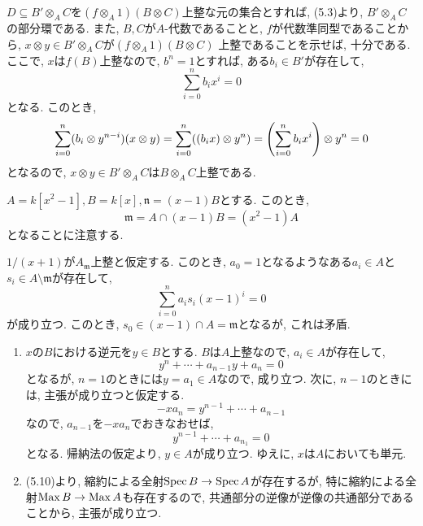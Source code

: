 \documentclass[dvipdfmx]{jsarticle}
\begin{document}
    \begin{problem}
        $D \subseteq B' \otimes_A C$を$(f\otimes_A 1)(B \otimes C)$上整な元の集合とすれば,
        (5.3)より, $B'\otimes_A C$の部分環である.
        また, $B, C$が$A$-代数であることと, $f$が代数準同型であることから,
        $x \otimes y \in B'\otimes_A C$が$(f\otimes_A 1)(B \otimes C)$
        上整であることを示せば, 十分である.
        ここで, $x$は$f(B)$上整なので, $b^n = 1$とすれば, ある$b_i \in B'$が存在して,
        \[
            \sum_{i = 0}^n b_ix^i = 0
        \]
        となる.
        このとき,
        \[
            \sum_{i = 0}^n (b_i \otimes y^{n-i})(x\otimes y) = \sum_{i=0}^n ((b_ix)\otimes y^n) = \qty(\sum_{i = 0}^n b_ix^i)\otimes y^n = 0
        \]
        となるので, $x\otimes y \in B'\otimes_A C$は$B\otimes_A C$上整である.
    \end{problem}

    \begin{problem}
        $A = k[x^2-1], B = k[x], \mathfrak{n} = (x-1)B$とする.
        このとき,
        \[
           \mathfrak{m} =  A \cap (x-1)B = (x^2-1)A
        \]
        となることに注意する.

        $1/(x+1)$が$A_{\mathfrak{m}}$上整と仮定する.
        このとき, $a_0 = 1$となるようなある$a_i \in A$と$s_i \in A \setminus \mathfrak{m}$が存在して,
        \[
            \sum_{i = 0}^n a_is_i(x-1)^i = 0
        \]
        が成り立つ.
        このとき, $s_0 \in (x-1) \cap A = \mathfrak{m}$となるが, これは矛盾.
    \end{problem}

    \begin{problem}
        \begin{enumerate}
            \item  $x$の$B$における逆元を$y \in B$とする.
            $B$は$A$上整なので, $a_i \in A$が存在して,
            \[
                y^n + \cdots + a_{n-1}y + a_n = 0
            \]
            となるが, $n = 1$のときには$y = a_1 \in A$なので, 成り立つ.
            次に, $n-1$のときには, 主張が成り立つと仮定する.
            \[
                -xa_n = y^{n-1} + \cdots + a_{n-1}
            \]
            なので, $a_{n-1}$を$-xa_n$でおきなおせば,
            \[
                y^{n-1} + \cdots + a_{n_1} = 0
            \]
            となる.
            帰納法の仮定より, $y \in A$が成り立つ.
            ゆえに, $x$は$A$においても単元.
            \item (5.10)より, 縮約による全射$\operatorname{Spec}{B} \to \operatorname{Spec}{A}$が存在するが,
            特に縮約による全射$\operatorname{Max}{B} \to \operatorname{Max}{A}$も存在するので, 共通部分の逆像が逆像の共通部分であることから, 主張が成り立つ.
        \end{enumerate}
    \end{problem}   
\end{document}
